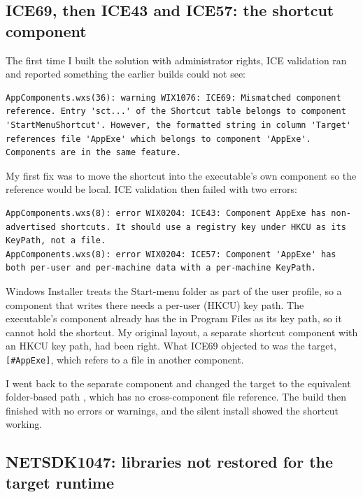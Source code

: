 \documentclass[11pt,a4paper]{article}
\newcommand{\file}{\path}
\begin{document}
\subsection{ICE69, then ICE43 and ICE57: the shortcut component}
\label{sec:ice}

The first time I built the solution with administrator rights, ICE validation ran and reported
something the earlier builds could not see:

\begin{lstlisting}
AppComponents.wxs(36): warning WIX1076: ICE69: Mismatched component reference. Entry 'sct...' of the Shortcut table belongs to component 'StartMenuShortcut'. However, the formatted string in column 'Target' references file 'AppExe' which belongs to component 'AppExe'. Components are in the same feature.
\end{lstlisting}

My first fix was to move the shortcut into the executable's own component so the reference would
be local. ICE validation then failed with two errors:

\begin{lstlisting}
AppComponents.wxs(8): error WIX0204: ICE43: Component AppExe has non-advertised shortcuts. It should use a registry key under HKCU as its KeyPath, not a file.
AppComponents.wxs(8): error WIX0204: ICE57: Component 'AppExe' has both per-user and per-machine data with a per-machine KeyPath.
\end{lstlisting}

Windows Installer treats the Start-menu folder as part of the user profile, so a component that
writes there needs a per-user (HKCU) key path. The executable's component already has the
\file{.exe} in Program Files as its key path, so it cannot hold the shortcut. My original layout,
a separate shortcut component with an HKCU key path, had been right. What ICE69 objected to was
the target, \texttt{[\#AppExe]}, which refers to a file in another component.

I went back to the separate component and changed the target to the equivalent folder-based path
\file{[INSTALLFOLDER]UnitConverter.exe}, which has no cross-component file reference. The build
then finished with no errors or warnings, and the silent install showed the shortcut working.

\subsection{NETSDK1047: libraries not restored for the target runtime}
\end{document}
